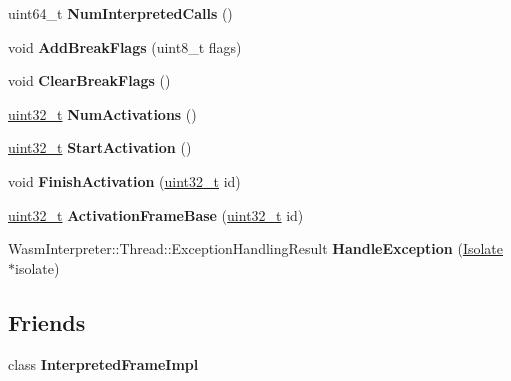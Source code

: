 \begin{DoxyCompactItemize}
uint64\+\_\+t {\bfseries Num\+Interpreted\+Calls} ()
\item 
\mbox{\label{classv8_1_1internal_1_1wasm_1_1ThreadImpl_a0bcf35a96148ee887d4ad01f2d9e50b8}} 
void {\bfseries Add\+Break\+Flags} (uint8\+\_\+t flags)
\item 
\mbox{\label{classv8_1_1internal_1_1wasm_1_1ThreadImpl_a05357722a1dec39909359ab856bd36dc}} 
void {\bfseries Clear\+Break\+Flags} ()
\item 
\mbox{\label{classv8_1_1internal_1_1wasm_1_1ThreadImpl_a538584708243cebac70233e451ae3239}} 
\mbox{\hyperlink{classuint32__t}{uint32\+\_\+t}} {\bfseries Num\+Activations} ()
\item 
\mbox{\label{classv8_1_1internal_1_1wasm_1_1ThreadImpl_a28b68fe42a9fc1d1bfedad52173bdf00}} 
\mbox{\hyperlink{classuint32__t}{uint32\+\_\+t}} {\bfseries Start\+Activation} ()
\item 
\mbox{\label{classv8_1_1internal_1_1wasm_1_1ThreadImpl_ac7b736062e95fcf89730aa5f5e0a7474}} 
void {\bfseries Finish\+Activation} (\mbox{\hyperlink{classuint32__t}{uint32\+\_\+t}} id)
\item 
\mbox{\label{classv8_1_1internal_1_1wasm_1_1ThreadImpl_a886638a85565ef9ee516991f7144cabb}} 
\mbox{\hyperlink{classuint32__t}{uint32\+\_\+t}} {\bfseries Activation\+Frame\+Base} (\mbox{\hyperlink{classuint32__t}{uint32\+\_\+t}} id)
\item 
\mbox{\label{classv8_1_1internal_1_1wasm_1_1ThreadImpl_a5da53c0d46f03630a19b7058d61fdcec}} 
Wasm\+Interpreter\+::\+Thread\+::\+Exception\+Handling\+Result {\bfseries Handle\+Exception} (\mbox{\hyperlink{classv8_1_1internal_1_1Isolate}{Isolate}} $\ast$isolate)
\end{DoxyCompactItemize}
\subsection*{Friends}
\begin{DoxyCompactItemize}
\item 
\mbox{\label{classv8_1_1internal_1_1wasm_1_1ThreadImpl_afbae1723f78f2af2e9e48421f01a8526}} 
class {\bfseries Interpreted\+Frame\+Impl}
\end{DoxyCompactItemize}


